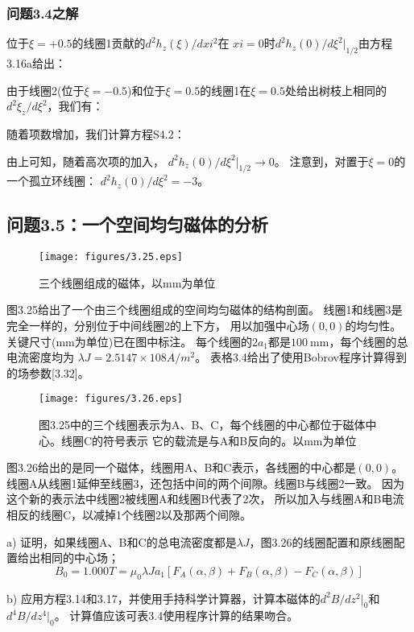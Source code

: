 \subsubsection{问题3.4之解}
位于$\xi=+0.5$的线圈1贡献的$d^2h_z(\xi)/dxi^2$在 $xi=0$时$d^2h_z(0)/d\xi^2|_{1/2}$由方程3.16a给出：

由于线圈2(位于$\xi=−0.5$)和位于$\xi=0.5$的线圈1在$\xi=0.5$处给出树枝上相同的$d^2\xi_z/d\xi^2$，我们有：

随着项数增加，我们计算方程S4.2：

由上可知，随着高次项的加入， $d^2h_z(0)/d\xi^2|_{1/2}\rightarrow 0$。
注意到，对置于$\xi=0$的一个孤立环线圈： $d^2h_z(0)/d\xi^2=−3$。
\newpage


\subsection{问题3.5：一个空间均匀磁体的分析}
\begin{figure}[htbp]
	\centering
	\texttt{[image: figures/3.25.eps]}
	\caption{三个线圈组成的磁体，以mm为单位}
\end{figure}
图3.25给出了一个由三个线圈组成的空间均匀磁体的结构剖面。
线圈1和线圈3是完全一样的，分别位于中间线圈2的上下方，
用以加强中心场$(0,0)$的均匀性。
关键尺寸(mm为单位)已在图中标注。
每个线圈的$2a_1$都是$100\ \mathrm{mm}$，每个线圈的总电流密度均为
$\lambda J =2.5147×108 A/m^2$。
表格3.4给出了使用Bobrov程序计算得到的场参数[3.32]。


\begin{figure}[htbp]
	\centering
	\texttt{[image: figures/3.26.eps]}
	\caption{图3.25中的三个线圈表示为A、B、C，每个线圈的中心都位于磁体中心。线圈C的符号表示
		它的载流是与A和B反向的。以mm为单位}
\end{figure}
图3.26给出的是同一个磁体，线圈用A、B和C表示，各线圈的中心都是$(0,0)$。
线圈A从线圈1延伸至线圈3，还包括中间的两个间隙。线圈B与线圈2一致。
因为这个新的表示法中线圈2被线圈A和线圈B代表了2次，
所以加入与线圈A和B电流相反的线圈C，以减掉1个线圈2以及那两个间隙。

a) 证明，如果线圈A、B和C的总电流密度都是$\lambda J$，图3.26的线圈配置和原线圈配置给出相同的中心场；
\begin{equation} %
B_0 = 1.000 T=\mu_0\lambda J a_1[F_A(\alpha,\beta)+F_B(\alpha,\beta)-F_C(\alpha,\beta)]
\end{equation}

b) 应用方程3.14和3.17，并使用手持科学计算器，计算本磁体的$d^2B/dz^2|_0$和$d^4B/dz^4|_0$。
计算值应该可表3.4使用程序计算的结果吻合。

